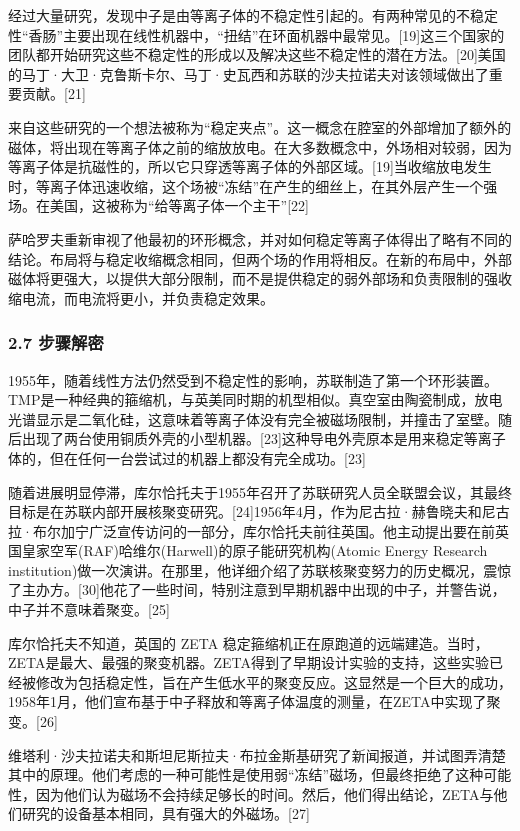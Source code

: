 经过大量研究，发现中子是由等离子体的不稳定性引起的。有两种常见的不稳定性“香肠”主要出现在线性机器中，“扭结”在环面机器中最常见。[19]这三个国家的团队都开始研究这些不稳定性的形成以及解决这些不稳定性的潜在方法。[20]美国的马丁·大卫·克鲁斯卡尔、马丁·史瓦西和苏联的沙夫拉诺夫对该领域做出了重要贡献。[21]

来自这些研究的一个想法被称为“稳定夹点”。这一概念在腔室的外部增加了额外的磁体，将出现在等离子体之前的缩放放电。在大多数概念中，外场相对较弱，因为等离子体是抗磁性的，所以它只穿透等离子体的外部区域。[19]当收缩放电发生时，等离子体迅速收缩，这个场被“冻结”在产生的细丝上，在其外层产生一个强场。在美国，这被称为“给等离子体一个主干”[22]

萨哈罗夫重新审视了他最初的环形概念，并对如何稳定等离子体得出了略有不同的结论。布局将与稳定收缩概念相同，但两个场的作用将相反。在新的布局中，外部磁体将更强大，以提供大部分限制，而不是提供稳定的弱外部场和负责限制的强收缩电流，而电流将更小，并负责稳定效果。
\subsubsection{2.7 步骤解密}
1955年，随着线性方法仍然受到不稳定性的影响，苏联制造了第一个环形装置。TMP是一种经典的箍缩机，与英美同时期的机型相似。真空室由陶瓷制成，放电光谱显示是二氧化硅，这意味着等离子体没有完全被磁场限制，并撞击了室壁。随后出现了两台使用铜质外壳的小型机器。[23]这种导电外壳原本是用来稳定等离子体的，但在任何一台尝试过的机器上都没有完全成功。[23]

随着进展明显停滞，库尔恰托夫于1955年召开了苏联研究人员全联盟会议，其最终目标是在苏联内部开展核聚变研究。[24]1956年4月，作为尼古拉·赫鲁晓夫和尼古拉·布尔加宁广泛宣传访问的一部分，库尔恰托夫前往英国。他主动提出要在前英国皇家空军(RAF)哈维尔(Harwell)的原子能研究机构(Atomic Energy Research institution)做一次演讲。在那里，他详细介绍了苏联核聚变努力的历史概况，震惊了主办方。[30]他花了一些时间，特别注意到早期机器中出现的中子，并警告说，中子并不意味着聚变。[25]

库尔恰托夫不知道，英国的 ZETA 稳定箍缩机正在原跑道的远端建造。当时，ZETA是最大、最强的聚变机器。ZETA得到了早期设计实验的支持，这些实验已经被修改为包括稳定性，旨在产生低水平的聚变反应。这显然是一个巨大的成功，1958年1月，他们宣布基于中子释放和等离子体温度的测量，在ZETA中实现了聚变。[26]

维塔利·沙夫拉诺夫和斯坦尼斯拉夫·布拉金斯基研究了新闻报道，并试图弄清楚其中的原理。他们考虑的一种可能性是使用弱“冻结”磁场，但最终拒绝了这种可能性，因为他们认为磁场不会持续足够长的时间。然后，他们得出结论，ZETA与他们研究的设备基本相同，具有强大的外磁场。[27]
